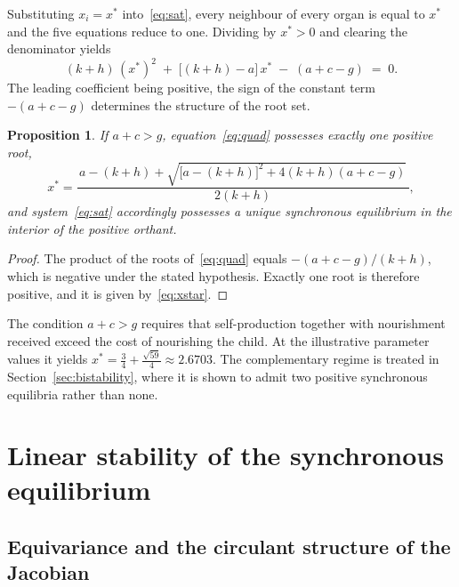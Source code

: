 \documentclass[11pt]{article}
\newtheorem{proposition}[theorem]{Proposition}
\theoremstyle{definition}
\theoremstyle{remark}
\begin{document}
	Substituting $x_i=x^\ast$ into~\eqref{eq:sat}, every neighbour of every organ is
	equal to $x^\ast$ and the five equations reduce to one. Dividing by $x^\ast>0$ and
	clearing the denominator yields
	\begin{equation}\label{eq:quad}
		(k+h)\,(x^\ast)^{2} \;+\; \bigl[(k+h)-a\bigr]\,x^\ast \;-\;(a+c-g) \;=\; 0 .
	\end{equation}
	The leading coefficient being positive, the sign of the constant term $-(a+c-g)$
	determines the structure of the root set.
	
	\begin{proposition}\label{prop:exist}
		If $a+c>g$, equation~\eqref{eq:quad} possesses exactly one positive root,
		\begin{equation}\label{eq:xstar}
			x^\ast=
			\frac{\,a-(k+h)+\sqrt{\bigl[a-(k+h)\bigr]^{2}+4(k+h)(a+c-g)}\,}{2(k+h)},
		\end{equation}
		and system~\eqref{eq:sat} accordingly possesses a unique synchronous equilibrium in
		the interior of the positive orthant.
	\end{proposition}
	
	\begin{proof}
		The product of the roots of~\eqref{eq:quad} equals $-(a+c-g)/(k+h)$, which is
		negative under the stated hypothesis. Exactly one root is therefore positive, and it
		is given by~\eqref{eq:xstar}.
	\end{proof}
	
	The condition $a+c>g$ requires that self-production together with nourishment
	received exceed the cost of nourishing the child. At the illustrative parameter
	values it yields $x^\ast=\tfrac34+\tfrac{\sqrt{59}}4\approx2.6703$. The complementary
	regime is treated in Section~\ref{sec:bistability}, where it is shown to admit two
	positive synchronous equilibria rather than none.
	
	\section{Linear stability of the synchronous equilibrium}\label{sec:stability}
	
	\subsection{Equivariance and the circulant structure of the Jacobian}
	
\end{document}
